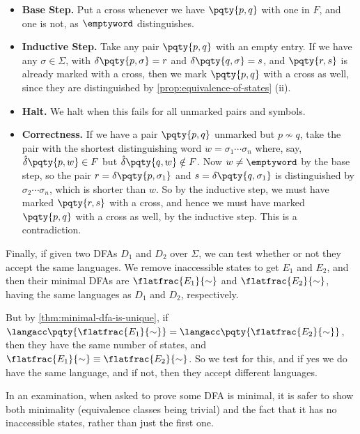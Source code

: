 \begin{itemize}
    \item \textbf{Base Step.} Put a cross whenever we have \(\pqty{p, q}\) with one in \(F\), and one is not, as \(\emptyword\) distinguishes.

    \item \textbf{Inductive Step.} Take any pair \(\pqty{p, q}\) with an empty entry. If we have any \(\sigma \in \Sigma\), with \(\delta\pqty{p, \sigma} = r\) and \(\delta\pqty{q, \sigma} = s\), and \(\pqty{r, s}\) is already marked with a cross, then we mark \(\pqty{p, q}\) with a cross as well, since they are distinguished by \autoref{prop:equivalence-of-states} (ii).

    \item \textbf{Halt.} We halt when this fails for all unmarked pairs and symbols.

    \item \textbf{Correctness.} If we have a pair \(\pqty{p, q}\) unmarked but \(p \nsim q\), take the pair with the shortest distinguishing word \(w = \sigma_1 \cdots \sigma_n\) where, say, \(\hat{\delta}\pqty{p, w} \in F\) but \(\hat{\delta}\pqty{q, w} \notin F\). Now \(w \neq \emptyword\) by the base step, so the pair \(r = \delta\pqty{p, \sigma_1}\) and \(s = \delta\pqty{q, \sigma_1}\) is distinguished by \(\sigma_2 \cdots \sigma_n\), which is shorter than \(w\). So by the inductive step, we must have marked \(\pqty{r, s}\) with a cross, and hence we must have marked \(\pqty{p, q}\) with a cross as well, by the inductive step. This is a contradiction.
\end{itemize}

Finally, if given two DFAs \(D_1\) and \(D_2\) over \(\Sigma\), we can test whether or not they accept the same languages. We remove inaccessible states to get \(E_1\) and \(E_2\), and then their minimal DFAs are \(\flatfrac{E_1}{\sim}\) and \(\flatfrac{E_2}{\sim}\), having the same languages as \(D_1\) and \(D_2\), respectively.

But by \autoref{thm:minimal-dfa-is-unique}, if \(\langacc\pqty{\flatfrac{E_1}{\sim}} = \langacc\pqty{\flatfrac{E_2}{\sim}}\), then they have the same number of states, and \(\flatfrac{E_1}{\sim} \equiv \flatfrac{E_2}{\sim}\). So we test for this, and if yes we do have the same language, and if not, then they accept different languages.

\begin{remark}
    In an examination, when asked to prove some DFA is minimal, it is safer to show both minimality (equivalence classes being trivial) and the fact that it has no inaccessible states, rather than just the first one.
\end{remark}